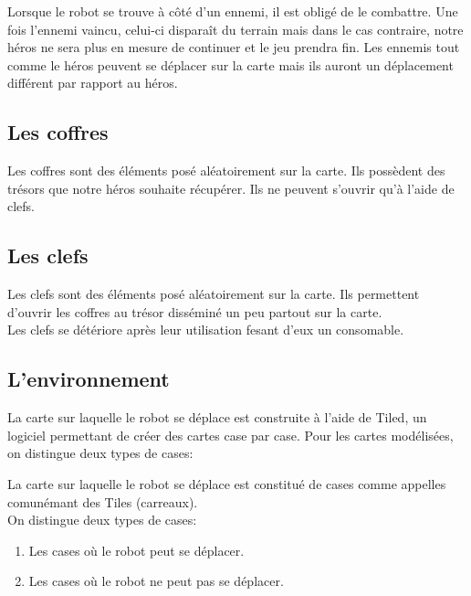 \documentclass[a4paper 12pts]{article}
\begin{document}
Lorsque le robot se trouve à côté d'un ennemi, il est obligé de le combattre. 
Une fois l'ennemi vaincu, celui-ci disparaît du terrain mais dans le cas contraire, 
notre héros ne sera plus en mesure de continuer et le jeu prendra fin.
Les ennemis tout comme le héros peuvent se déplacer sur la carte mais ils auront un déplacement différent par rapport au héros.



\newpage
\subsection{Les coffres}


\vspace{0.75cm}

Les coffres sont des éléments posé aléatoirement sur la carte. Ils possèdent des trésors que notre héros souhaite récupérer.
Ils ne peuvent s'ouvrir qu'à l'aide de clefs.


\vspace{0.75cm}

\subsection{Les clefs}

\vspace{0.75cm}

Les clefs sont des éléments posé aléatoirement sur la carte. Ils permettent d'ouvrir les coffres au trésor disséminé un peu partout sur la carte.\\
Les clefs se détériore après leur utilisation fesant d'eux un consomable.


\vspace{0.75cm}


\subsection{L'environnement}
La carte sur laquelle le robot se déplace est construite à l'aide de Tiled, un logiciel permettant de créer des cartes case par case. 
Pour les cartes modélisées, on distingue deux types de cases:


\vspace{0.75cm}

La carte sur laquelle le robot se déplace est constitué de cases comme appelles comunémant des Tiles (carreaux). \\
On distingue deux types de cases:

\begin{enumerate}
	\item Les cases où le robot peut se déplacer.
	\item Les cases où le robot ne peut pas se déplacer.
\end{enumerate}
\end{document}
